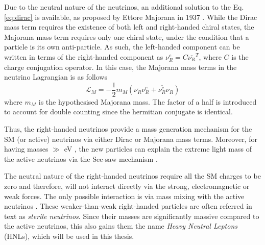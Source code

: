 Due to the neutral nature of the neutrinos, an additional solution to the Eq. \ref{eq:dirac} is available, as proposed by Ettore Majorana in 1937 \cite{Majorana}.
While the Dirac mass term requires the existence of both left and right-handed chiral states, the Majorana mass term requires only one chiral state, under the condition that a particle is its own anti-particle.
As such, the left-handed component can be written in terms of the right-handed component as $\nu^{c}_{R}=C\overline{\nu_{R}}^{T}$, where $C$ is the charge conjugation operator.
In this case, the Majorana mass terms in the neutrino Lagrangian is as follows \cite{Thomson}
\begin{equation}
	\mathcal{L}_{M} = -\frac{1}{2}m_{M}(\overline{\nu_{R}}\nu_{R}^{c} + \overline{\nu_{R}^{c}}\nu_{R})
\end{equation}
where $m_{M}$ is the hypothesised Majorana mass. 
The factor of a half is introduced to account for double counting since the hermitian conjugate is identical.

Thus, the right-handed neutrinos provide a mass generation mechanism for the SM (or active) neutrinos via either Dirac or Majorana mass terms.
Moreover, for having masses $\gg$ eV , the new particles can explain the extreme light mass of the active neutrinos via the See-saw mechanism \cite{nuMass}.

The neutral nature of the right-handed neutrinos require all the SM charges to be zero and therefore, will not interact directly via the strong, electromagnetic or weak forces.
The only possible interaction is via mass mixing with the active neutrinos \cite{SBNHNL}.
These weaker-than-weak right-handed particles are often referred in text as \textit{sterile neutrinos}.
Since their masses are significantly massive compared to the active neutrinos, this also gains them the name \textit{Heavy Neutral Leptons} (HNLs), which will be used in this thesis.

